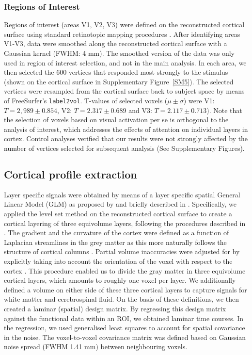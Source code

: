 \subsubsection{Regions of Interest}
Regions of interest (areas V1, V2, V3) were defined on the reconstructed cortical surface using standard retinotopic mapping procedures \cite{Sereno1995,DeYoe1996,Engel1997}. After identifying areas V1-V3, data were smoothed along the reconstructed cortical surface with a Gaussian kernel (FWHM: 4 mm). The smoothed version of the data was only used in region of interest selection, and not in the main analysis. In each area, we then selected the 600 vertices that responded most strongly to the stimulus (shown on the cortical surface in Supplementary Figure~\ref{SM5}). The selected vertices were resampled from the cortical surface back to subject space by means of FreeSurfer's \texttt{label2vol}. T-values of selected voxels ($\mu \pm \sigma$) were V1: $T=2,989 \pm 0.854$, V2: $T=2.317 \pm 0.689$ and V3: $T=2.117 \pm 0.713$). Note that the selection of voxels based on visual activation per se is orthogonal to the analysis of interest, which addresses the effects of attention on individual layers in cortex. Control analyses verified that our results were not strongly affected by the number of vertices selected for subsequent analysis (See Supplementary Figures).

\subsection{Cortical profile extraction}
Layer specific signals were obtained by means of a layer specific spatial General Linear Model (GLM) as proposed by \cite{VanMourikISMRM2015} and briefly described in \cite{Kok2016}. Specifically, we applied the level set method \cite{Sethian1999} on the reconstructed cortical surface \cite{Dale1999} to create a cortical layering of three equivolume layers, following the procedures described in \cite{Waehnert2014}. The gradient and the curvature of the cortex were defined as a function of Laplacian streamlines in the grey matter as this more naturally follows the structure of cortical columns \cite{Leprince2015}. Partial volume inaccuracies were adjusted for by explicitly taking into account the orientation of the voxel with respect to the cortex \cite{VanMourikISMRM2015}. This procedure enabled us to divide the gray matter in three equivolume cortical layers, which amounts to roughly one voxel per layer. We additionally defined a volume on either side of these three cortical layers to capture signals for white matter and cerebrospinal fluid. On the basis of  these definitions, we then created a laminar (spatial) design matrix. By regressing this design matrix against the functional data within an ROI, we obtained laminar time courses. In the regression, we used generalised least squares to account for spatial covariance in the noise. The voxel-to-voxel covariance matrix was defined based on Gaussian noise spread (FWHM 1.41 mm) between neighbouring voxels. 

